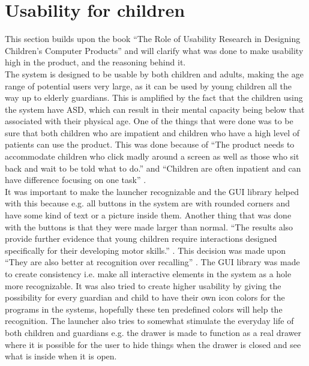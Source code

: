 \section{Usability for children}
\label{Preanalysis:Usability_for_children}
This section builds upon the book  "`The Role of Usability Research in Designing Children's Computer Products"' and will clarify what was done to make usability high in the product, and the reasoning behind it.\\

The \giraf[] system is designed to be usable by both children and adults, making the age range of potential users very large, as it can be used by young children all the way up to elderly guardians. 
This is amplified by the fact that the children using the system have ASD, which can result in their mental capacity being below that associated with their physical age. \newline
One of the things that were done was to be sure that both children who are impatient and children who have a high level of patients can use the product. 
This was done because of ``The product needs to accommodate children who click madly around a screen as well as those who sit back and wait to be told what to do.'' \citep{microsoft:usability} and ``Children are often inpatient and can have difference focusing on one task'' \citep{microsoft:usability}.\\
It was important to make the launcher recognizable and the \giraf[] GUI library helped with this because e.g. all buttons in the \giraf[] system are with rounded corners and have some kind of text or a picture inside them. 
Another thing that was done with the buttons is that they were made larger than normal. 
``The results also provide further evidence that young children require interactions designed specifically for their developing motor skills.'' \citep[p. 8]{mousesize}.
This decision was made upon ``They are also better at recognition over recalling'' \citep{microsoft:usability}. 
The \giraf[] GUI library was made to create consistency i.e. make all interactive elements in the \giraf[] system as a hole more recognizable. 
It was also tried to create higher usability by giving the possibility for every guardian and child to have their own icon colors for the programs in the \giraf[] systems, hopefully these ten predefined colors will help the recognition. 
The launcher also tries to somewhat stimulate the everyday life of both children and guardians e.g. the drawer is made to function as a real drawer where it is possible for the user to hide things when the drawer is closed and see what is inside when it is open. 
